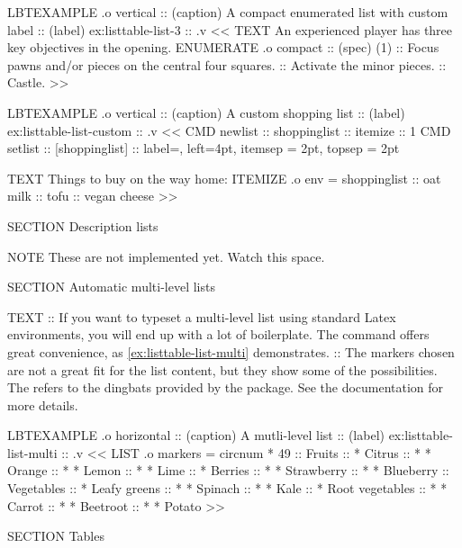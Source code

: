 \begin{lbt}
    LBTEXAMPLE .o vertical
    :: (caption) A compact enumerated list with custom label
    :: (label) ex:listtable-list-3
    :: .v <<
      TEXT An experienced player has three key objectives in the opening.
      ENUMERATE .o compact :: (spec) (1)
      :: Focus pawns and/or pieces on the central four squares.
      :: Activate the minor pieces.
      :: Castle.
    >>

    LBTEXAMPLE .o vertical
    :: (caption) A custom shopping list
    :: (label) ex:listtable-list-custom
    :: .v <<
      CMD newlist :: shoppinglist :: itemize :: 1
      CMD setlist :: [shoppinglist]
      :: label=, left=4pt, itemsep = 2pt, topsep = 2pt

      TEXT Things to buy on the way home:
      ITEMIZE .o env = shoppinglist
      :: oat milk
      :: tofu
      :: vegan cheese
    >>

    SECTION Description lists

    NOTE These are not implemented yet. Watch this space.

    SECTION Automatic multi-level lists

    TEXT
    :: If you want to typeset a multi-level list using standard Latex environments, you will end up with a lot of boilerplate. The \lbtlogo{} command  offers great convenience, as \vref{ex:listtable-list-multi} demonstrates.
    :: The markers chosen are not a great fit for the list content, but they show some of the possibilities. The  refers to the dingbats provided by the  package. See the documentation for more details.

    LBTEXAMPLE .o horizontal
    :: (caption) A mutli-level list
    :: (label) ex:listtable-list-multi
    :: .v <<
      LIST .o markers = circnum * 49
      :: Fruits
      :: * Citrus
      :: * * Orange
      :: * * Lemon
      :: * * Lime
      :: * Berries
      :: * * Strawberry
      :: * * Blueberry
      :: Vegetables
      :: * Leafy greens
      :: * * Spinach
      :: * * Kale
      :: * Root vegetables
      :: * * Carrot
      :: * * Beetroot
      :: * * Potato
    >>

    SECTION Tables


\end{lbt}
